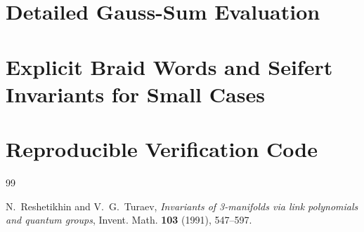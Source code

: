 \documentclass[11pt,a4paper]{amsart}
\begin{document}
\section{Detailed Gauss-Sum Evaluation}
\label{app:gauss}


\section{Explicit Braid Words and Seifert Invariants for Small Cases}
\label{app:examples}

\section{Reproducible Verification Code}
\label{app:code}



\begin{thebibliography}{99}

N.~Reshetikhin and V.~G.~Turaev, \emph{Invariants of 3-manifolds via link polynomials and quantum groups}, Invent. Math. \textbf{103} (1991), 547--597.


\end{thebibliography}
\end{document}
